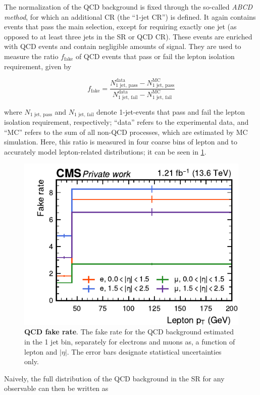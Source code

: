 The normalization of the QCD background is fixed through the so-called \textit{ABCD method}, for which an additional CR (the ``1-jet CR'') is defined.
It again contains events that pass the main selection, except for requiring exactly one jet (as opposed to at least three jets in the SR or QCD CR). These events are enriched with QCD events and contain negligible amounts of \ttbar signal. They are used to measure the ratio $f_{\mathrm{fake}}$ of QCD events that pass or fail the lepton isolation requirement, given by

\begin{equation}
\label{eq:ttxs:abcd_fakerate}
    f_{\mathrm{fake}} = \frac{ N_{\text{1 jet, pass}}^{\text{data}} - N_{\text{1 jet, pass}}^{\text{MC}} }{ N_{\text{1 jet, fail}}^{\text{data}} - N_{\text{1 jet, fail}}^{\text{MC}} }
\end{equation}

\noindent where $N_{\text{1 jet, pass}}$ and $N_{\text{1 jet, fail}}$ denote 1-jet-events that pass and fail the lepton isolation requirement, respectively; ``data'' refers to the experimental data, and ``MC'' refers to the sum of all non-QCD processes, which are estimated by MC simulation. Here, this ratio is measured in four coarse bins of lepton \pt and \abseta to accurately model lepton-related distributions; it can be seen in \cref{fig:ttxs:fakerate}.

\begin{figure}[!ht]
    \centering
    \includegraphics[width=0.58 \textwidth]{figures/ttxs/np_plots_run3/fakerate.pdf}
    \caption{\textbf{QCD fake rate}. The fake rate for the QCD background estimated in the 1 jet bin, separately for electrons and muons as, a function of lepton \pt and $|\eta|$. The error bars designate statistical uncertainties only.}
    \label{fig:ttxs:fakerate}
\end{figure}

Naively, the full distribution of the QCD background in the SR for any observable can then be written as

